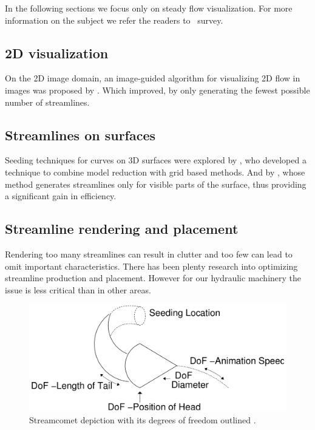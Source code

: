 In the following sections we focus only on steady flow visualization.
For more information on the subject we refer the readers to~\cite{McLoughlin2010} survey.

\subsection{2D visualization}

On the 2D image domain, an image-guided algorithm for visualizing 2D flow in images was proposed by \cite{Turk1996}.
Which \cite{Li2008} improved, by only generating the fewest possible number of streamlines. 

\subsection{Streamlines on surfaces}

Seeding techniques for curves on 3D surfaces were explored by  \cite{Wicke2009}, who developed a technique to combine model reduction with grid based methods.
And by \cite{Spencer2009}, whose method generates streamlines only for visible parts of the surface, thus providing a significant gain in efficiency.

\subsection{Streamline rendering and placement}

Rendering too many streamlines can result in clutter and too few can lead to omit important characteristics.
There has been plenty research into optimizing streamline production and placement.
However for our hydraulic machinery the issue is less critical than in other areas.

\begin{figure}
	\centering
	\includegraphics[scale=.2]{images/streamComet}
	\caption{Streamcomet depiction with its degrees of freedom outlined \cite{Laramee2005}.}
	\label{fig:streamComent}
\end{figure}

